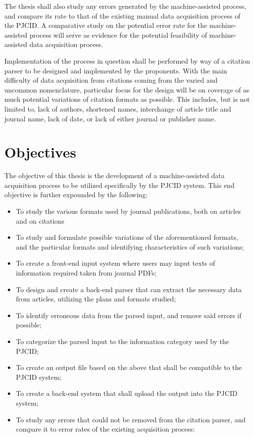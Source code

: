 The thesis shall also study any errors generated by the machine-assisted process, and compare its rate to that of the existing manual data acquisition process of the PJCID. A comparative study on the potential error rate for the machine-assisted process will serve as evidence for the potential feasibility of machine-assisted data acquisition process.

Implementation of the process in question shall be performed by way of a citation parser to be designed and implemented by the proponents. With the main difficulty of data acquisition from citations coming from the varied and uncommon nomenclature, particular focus for the design will be on coverage of as much potential variations of citation formats as possible. This includes, but is not limited to, lack of authors, shortened names, interchange of article title and journal name, lack of date, or lack of either journal or publisher name.

\section{Objectives}
The objective of this thesis is the development of a machine-assisted data acquisition process to be utilized specifically by the PJCID system. This end objective is further expounded by the following:
\begin{itemize}
	\item To study the various formats used by journal publications, both on articles and on citations
	\item To study and formulate possible variations of the aforementioned formats, and the particular formats and identifying characteristics of such variations;
	\item To create a front-end input system where users may input texts of information required taken from journal PDFs;
	\item To design and create a back-end parser that can extract the necessary data from articles, utilizing the plans and formats studied;
	\item To identify erroneous data from the parsed input, and remove said errors if possible;
	\item To categorize the parsed input to the information category used by the PJCID;
	\item To create an output file based on the above that shall be compatible to the PJCID system;
	\item To create a back-end system that shall upload the output into the PJCID system;
	\item To study any errors that could not be removed from the citation parser, and compare it to error rates of the existing acquisition process:
\end{itemize}
\vfill\eject
